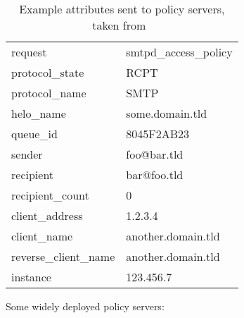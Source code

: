 \begin{table}[ht]

    \caption{Example attributes sent to policy servers, taken
    from~\cite{policy-servers}}
    \empty{}\label{Example attributes sent to policy servers}

    \centering{}

    \begin{tabular}[]{ll}

        request                 & smtpd\_access\_policy     \\
        protocol\_state         & RCPT                      \\
        protocol\_name          & SMTP                      \\
        helo\_name              & some.domain.tld           \\
        queue\_id               & 8045F2AB23                \\
        sender                  & foo@bar.tld               \\
        recipient               & bar@foo.tld               \\
        recipient\_count        & 0                         \\
        client\_address         & 1.2.3.4                   \\
        client\_name            & another.domain.tld        \\
        reverse\_client\_name   & another.domain.tld        \\
        instance                & 123.456.7                 \\

    \end{tabular}

\end{table}

Some widely deployed policy servers:

